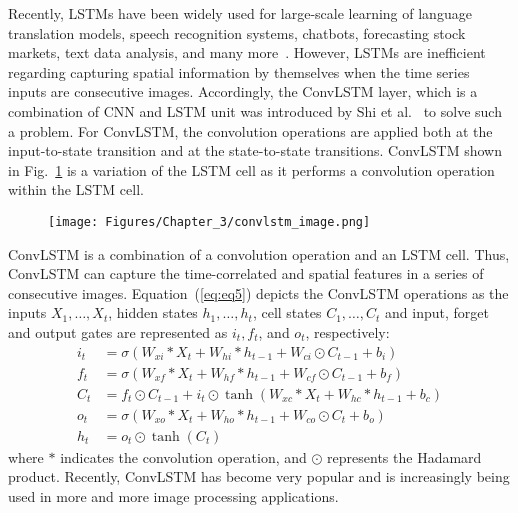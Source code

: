 Recently, LSTMs have been widely used for large-scale learning of language translation models, speech recognition systems, chatbots, forecasting stock markets, text data analysis, and many more~\cite{graves2014towards, cho2014properties}.
However, LSTMs are inefficient regarding capturing spatial information by themselves when the time series inputs are consecutive images.
Accordingly, the ConvLSTM layer, which is a combination of CNN and LSTM unit was introduced by Shi et al.~\cite{xingjian2015convolutional} to solve such a problem.
For ConvLSTM, the convolution operations are applied both at the input-to-state transition and at the state-to-state transitions.
ConvLSTM shown in Fig.~\ref{fig:ConvLSTM} is a variation of the LSTM cell as it performs a convolution operation within the LSTM cell.
\begin{figure}[h!]
	\begin{center}
		\texttt{[image: Figures/Chapter\_3/convlstm\_image.png]}
	\end{center}
	\label{fig:ConvLSTM}
\end{figure}
ConvLSTM is a combination of a convolution operation and an LSTM cell.
Thus, ConvLSTM can capture the time-correlated and spatial features in a series of consecutive images. 
Equation~(\ref{eq:eq5}) depicts the ConvLSTM operations as the inputs \(X_1, \dots, X_t\), hidden states \(h_1, \dots, h_t\), cell states \(C_1, \dots, C_t\) and input, forget and output gates are represented as \(i_t, f_t\), and \(o_t\), respectively:
\begin{equation}
	\begin{aligned}
		i_{t} &=\sigma\left(W_{x i} * X_{t}+W_{h i} * h_{t-1}+W_{c i} \odot C_{t-1}+b_{i}\right) 
		\\
		f_{t} &=\sigma\left(W_{x f} * X_{t}+W_{h f} * h_{t-1}+W_{c f} \odot C_{t-1}+b_{f}\right) \\
		C_{t} &=f_{t} \odot C_{t-1}+i_{t} \odot \tanh \left(W_{x c} * X_{t}+W_{h c} * h_{t-1}+b_{c}\right) 
		\\
		o_{t} &=\sigma\left(W_{x o} * X_{t}+W_{h o} * h_{t-1}+W_{c o} \odot C_{t}+b_{o}\right) \\
		h_{t} &=o_{t} \odot \tanh \left(C_{t}\right)
	\end{aligned}
	\label{eq:eq5}
\end{equation}
where \(*\) indicates the convolution operation, and \(\odot\) represents the 
Hadamard product. 
Recently, ConvLSTM has become very popular and is increasingly being used in 
more and more image processing applications.